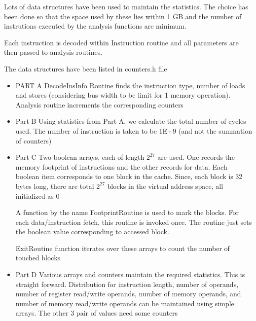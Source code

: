 Lots of data structures have been used to maintain the statistics. The choice has been done so that the space used by these lies within 1 GB and the number of instrutions executed by the analysis functions are minimum. \par

Each instruction is decoded within Instruction routine and all parameters are then passed to analysis routines.

The data structures have been listed in counters.h file \par

\begin{itemize}
    \item PART A
    DecodeInsInfo Routine finds the instruction type, number of loads and stores (considering bus width to be limit for 1 memory operation). Analysis routine increments the corresponding counters

    \item Part B
    Using statistics from Part A, we calculate the total number of cycles used. The number of instruction is taken to be 1E+9 (and not the summation of counters)

    \item Part C
    Two boolean arrays, each of length $2^{27}$ are used. One records the memory footprint of instructions and the other records for data. Each boolean item corresponds to one block in the cache. Since, each block is 32 bytes long, there are total $2^{27}$ blocks in the virtual address space, all initialized as 0 \par
    A function by the name FootprintRoutine is used to mark the blocks. For each data/instruction fetch, this routine is invoked once. The routine just sets the boolean value corresponding to accessed block. \par
    ExitRoutine function iterates over these arrays to count the number of touched blocks

    \item Part D
    Various arrays and counters maintain the required statistics. This is straight forward. Distribution for instruction length, number of operands, number of register read/write operands, number of memory operands, and number of memory read/write operands can be maintained using simple arrays. The other 3 pair of values need some counters

\end{itemize}
